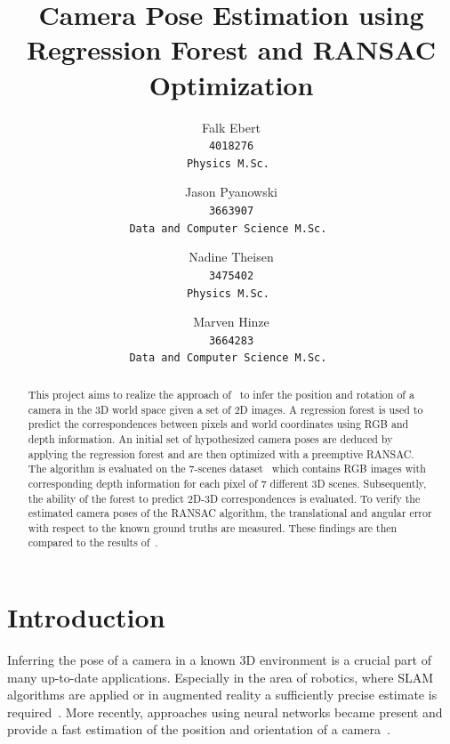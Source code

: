 \documentclass[final]{cvpr}
\begin{document}
\title{Camera Pose Estimation using Regression Forest and RANSAC Optimization}

\author{Falk Ebert\\
\tt 4018276\\
{\tt\small Physics M.Sc.}
\and
Jason Pyanowski\\
\tt 3663907\\
{\tt\small Data and Computer Science M.Sc.}
\and
Nadine Theisen\\
\tt 3475402\\
{\tt\small Physics M.Sc.}
\and
Marven Hinze\\
\tt 3664283\\
{\tt\small Data and Computer Science M.Sc.}
}

\maketitle


\begin{abstract}
This project aims to realize the approach of~\cite{shotton2013} to infer the position and rotation of a camera
in the 3D world space given a set of 2D images. A regression forest is used to predict the correspondences between 
pixels and world coordinates using RGB and depth information. An initial set of hypothesized camera
poses are deduced by applying the regression forest and are then optimized with a preemptive RANSAC. The algorithm 
is evaluated on the 7-scenes dataset~\cite{glocker2013} which contains RGB images with corresponding depth
information for each pixel of 7 different 3D scenes. Subsequently, the ability of the forest to predict 2D-3D 
correspondences is evaluated. To verify the estimated camera poses of the RANSAC algorithm, the translational and 
angular error with respect to the known ground truths are measured. These findings are then compared to the results
of~\cite{shotton2013}. 
\end{abstract}

\section{Introduction}
Inferring the pose of a camera in a known 3D environment is a crucial part of many up-to-date applications.
Especially in the area of robotics, where \ac{SLAM} algorithms are applied or in augmented reality a sufficiently precise 
estimate is required~\cite{shotton2013}. More recently, approaches using neural networks became present and provide
a fast estimation of the position and orientation of a camera~\cite{Blanton2020}. 
\end{document}

